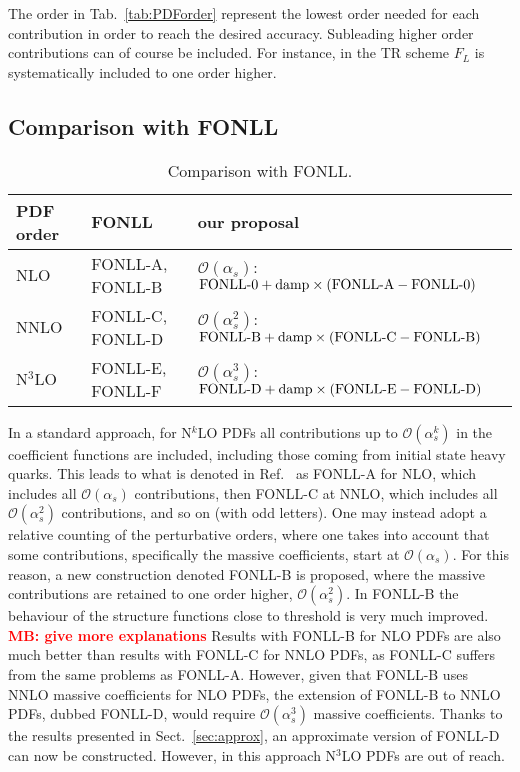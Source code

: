 \documentclass[a4paper,10pt]{article}
\newcommand{\as}{\alpha_s}
\newcommand{\Ord}{\mathcal{O}}
\newcommand{\FONLL}[1]{\text{FONLL-#1}}
\let\oldsubsection\subsection
\renewcommand\subsection[2][\subsectiontoc]{%
  \def\subsectiontoc{#2}%
  \oldsubsection[#1]{\boldmath #2}%
}
\newcommand{\MB}[1]{\textbf{\textcolor{red}   {MB: #1}}}
\begin{document}
The order in Tab.~\ref{tab:PDForder} represent the lowest order needed for each contribution in order to reach the desired accuracy.
Subleading higher order contributions can of course be included.
For instance, in the TR scheme $F_L$ is systematically included to one order higher.




\subsection{Comparison with FONLL}

\begin{table}[t]
  \centering
  \begin{tabular}{l|ll}
    PDF order & FONLL & our proposal \\
    \midrule
    NLO & FONLL-A, FONLL-B & $\Ord(\as)$: $\FONLL{0} + {\rm damp}\times(\FONLL{A}-\FONLL{0})$ \\
    NNLO & FONLL-C, FONLL-D & $\Ord(\as^2)$: $\FONLL{B} + {\rm damp}\times(\FONLL{C}-\FONLL{B})$ \\
    N$^3$LO & FONLL-E, FONLL-F & $\Ord(\as^3)$: $\FONLL{D} + {\rm damp}\times(\FONLL{E}-\FONLL{D})$
  \end{tabular}
  \caption{Comparison with FONLL.}
  \label{tab:counting}
\end{table}

In a standard approach, for N$^k$LO PDFs all contributions up to $\Ord(\as^k)$ in the coefficient functions are included,
including those coming from initial state heavy quarks.
This leads to what is denoted in Ref.~\cite{Forte:} as FONLL-A for NLO, which includes all $\Ord(\as)$ contributions,
then FONLL-C at NNLO, which includes all $\Ord(\as^2)$ contributions, and so on (with odd letters).
One may instead adopt a relative counting of the perturbative orders, where one takes into account that some contributions,
specifically the massive coefficients, start at $\Ord(\as)$.
For this reason, a new construction denoted FONLL-B is proposed,
where the massive contributions are retained to one order higher, $\Ord(\as^2)$.
In FONLL-B the behaviour of the structure functions close to threshold is very much improved.
\MB{give more explanations}
Results with FONLL-B for NLO PDFs are also much better than results with FONLL-C for NNLO PDFs,
as FONLL-C suffers from the same problems as FONLL-A.
However, given that FONLL-B uses NNLO massive coefficients for NLO PDFs,
the extension of FONLL-B to NNLO PDFs, dubbed FONLL-D, would require $\Ord(\as^3)$ massive coefficients.
Thanks to the results presented in Sect.~\ref{sec:approx}, an approximate version of FONLL-D can
now be constructed. However, in this approach N$^3$LO PDFs are out of reach.
\end{document}
